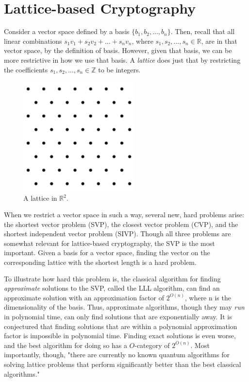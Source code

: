 \documentclass{article}
\begin{document}
\section{Lattice-based Cryptography}

Consider a vector space defined by a basis $ \{ b_1, b_2, ..., b_n \} $. Then, recall that all linear combinations $ s_1 v_1 + s_2 v_2 + ... + s_n v_n $, where $ s_1, s_2, ..., s_n \in \mathbb{R} $, are in that vector space, by the definition of basis. However, given that basis, we can be more restrictive in how we use that basis. A \textit{lattice} does just that by restricting the coefficients $ s_1, s_2, ..., s_n \in \mathbb{Z} $ to be integers.\cite{bernstein09}

\begin{figure}[h!]
	\centering
	\includegraphics[width=60mm]{Equilateral_Triangle_Lattice.png}
	\caption{A lattice in $ \mathbb{R}^2 $.}
\end{figure}

When we restrict a vector space in such a way, several new, hard problems arise: the shortest vector problem (SVP), the closest vector problem (CVP), and the shortest independent vector problem (SIVP). Though all three problems are somewhat relevant for lattice-based cryptography, the SVP is the most important. Given a basis for a vector space, finding the vector on the corresponding lattice with the shortest length is a hard problem.\cite{koc15}

To illustrate how hard this problem is, the classical algorithm for finding \textit{approximate} solutions to the SVP, called the LLL algorithm, can find an approximate solution with an approximation factor of $ 2^{O(n)} $, where n is the dimensionality of the basis. Thus, approximate algorithms, though they may \textit{run} in polynomial time, can only find solutions that are exponentially away. It is conjectured that finding solutions that are within a polynomial approximation factor is impossible in polynomial time. Finding exact solutions is even worse, and the best algorithm for doing so has a $O$-category of $ 2^{O(n)} $. Most importantly, though, "there are currently no known quantum algorithms for solving lattice problems that perform significantly better than the best classical algorithms."\cite{bernstein09}
\end{document}
